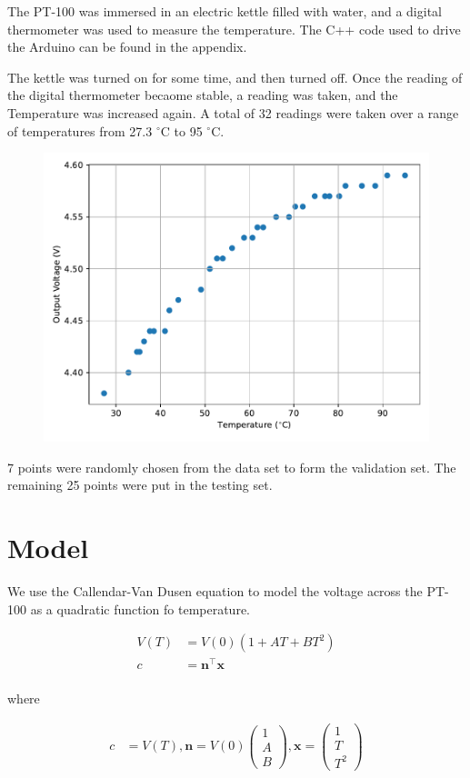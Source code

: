\documentclass{article}
\let\vec\mathbf
\newcommand{\myvec}[1]{\ensuremath{\begin{pmatrix}#1\end{pmatrix}}}
\begin{document}
The PT-100 was immersed in an electric kettle filled with water, and a digital
thermometer was used to measure the temperature. The C++ code used to drive the
Arduino can be found in the appendix.

The kettle was turned on for some time, and then turned off. Once the reading of
the digital thermometer becaome stable, a reading was taken, and the Temperature
was increased again. A total of 32 readings were taken over a range of temperatures
from 27.3 $^\circ$C to 95 $^\circ$C.

\begin{figure}[h!]
\centering
\includegraphics[width=0.75\linewidth]{figs/data}
\end{figure}

7 points were randomly chosen from the data set to form the
validation set. The remaining 25 points were put in the
testing set.

\section{Model}

We use the Callendar-Van Dusen equation to model the voltage across the PT-100
as a quadratic function fo temperature.

\begin{align*}
    V(T) &= V(0)(1 + AT + BT^2) \\
    c &= \vec{n}^\top \vec{x} \\
\end{align*}

where

\begin{align*}    
    c &= V(T), \vec{n} = V(0)\myvec{1 \\ A \\ B}, \vec{x} = \myvec{1 \\ T \\ T^2}
\end{align*}
\end{document}
